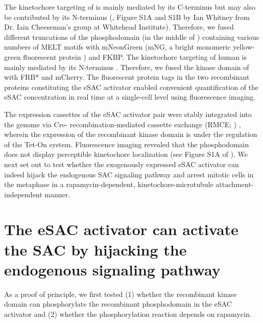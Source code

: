 The kinetochore targeting of  is mainly mediated by its C-terminus \cite{KNL1CTer_Kiyomitsu2007, Screpanti2011, Knl1CTer, MIS12CStructure_Petrovic2016, Spc105pCTer-MIND_Maskell2010} but may also be contributed by its N-terminus (\cite{eSAC}, Figure S1A and S1B by Ian Whitney from Dr. Iain Cheeseman's group at Whitehead Institute). Therefore, we fused different truncations of the  phosphodomain (in the middle of ) containing various numbers of MELT motifs with mNeonGreen (mNG, a bright monomeric yellow-green fluorescent protein \cite{mNG}) and FKBP. The kinetochore targeting of human  is mainly mediated by its N-terminus \cite{MPS1Localization_Ji, MPS1Localization_Hiruma, BuddingYeasteSAC}. Therefore, we fused the kinase domain of  with FRB* \cite{FRB_T2098L} and mCherry. The fluorescent protein tags in the two recombinant proteins constituting the eSAC activator enabled convenient quantification of the eSAC concentration in real time at a single-cell level using fluorescence imaging.

The expression cassettes of the eSAC activator pair were stably integrated into the genome via Cre- recombination-mediated cassette exchange (RMCE; ) \cite{HeLa-A12_Khandelia2011, HeLa-A12_Ballister2014}, wherein the expression of the recombinant  kinase domain is under the regulation of the Tet-On system. Fluorescence imaging revealed that the  phosphodomain does not display perceptible kinetochore localization (see Figure S1A of \cite{eSAC}). We next set out to test whether the exogenously expressed eSAC activator can indeed hijack the endogenous SAC signaling pathway and arrest mitotic cells in the metaphase in a rapamycin-dependent, kinetochore-microtubule attachment-independent manner.

\section{The eSAC activator can activate the SAC by hijacking the endogenous signaling pathway}

As a proof of principle, we first tested (1) whether the recombinant  kinase domain can phosphorylate the recombinant  phosphodomain in the eSAC activator and (2) whether the phosphorylation reaction depends on rapamycin.

